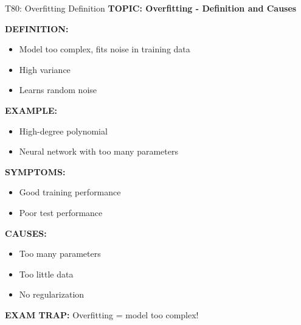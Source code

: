\documentclass[8pt]{beamer}
\begin{document}
	\begin{frame}{T80: Overfitting Definition}
		\fontsize{6.5}{7.5}\selectfont
		\textbf{TOPIC: Overfitting - Definition and Causes}
		
		\vspace{0.1cm}
		\textbf{DEFINITION:}
		\begin{itemize}
			\item Model too complex, fits noise in training data
			\item High variance
			\item Learns random noise
		\end{itemize}
		
		\vspace{0.1cm}
		\textbf{EXAMPLE:}
		\begin{itemize}
			\item High-degree polynomial
			\item Neural network with too many parameters
		\end{itemize}
		
		\vspace{0.1cm}
		\textbf{SYMPTOMS:}
		\begin{itemize}
			\item Good training performance
			\item Poor test performance
		\end{itemize}
		
		\vspace{0.1cm}
		\textbf{CAUSES:}
		\begin{itemize}
			\item Too many parameters
			\item Too little data
			\item No regularization
		\end{itemize}
		
		\textcolor{myred}{\textbf{EXAM TRAP:}} Overfitting = \textcolor{myblue}{model too complex}!
	\end{frame}
	
\end{document}
